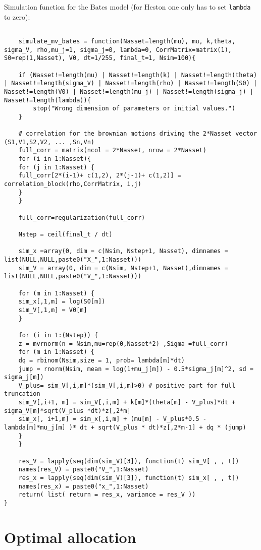 \bigskip
\noindent
Simulation function for the Bates model (for Heston one only has to set \texttt{lambda} to zero):
\begin{lstlisting}

	simulate_mv_bates = function(Nasset=length(mu), mu, k,theta, sigma_V, rho,mu_j=1, sigma_j=0, lambda=0, CorrMatrix=matrix(1), S0=rep(1,Nasset), V0, dt=1/255, final_t=1, Nsim=100){
	
	if (Nasset!=length(mu) | Nasset!=length(k) | Nasset!=length(theta) | Nasset!=length(sigma_V) | Nasset!=length(rho) | Nasset!=length(S0) | Nasset!=length(V0) | Nasset!=length(mu_j) | Nasset!=length(sigma_j) | Nasset!=length(lambda)){
		stop("Wrong dimension of parameters or initial values.")
	}
	
	# correlation for the brownian motions driving the 2*Nasset vector (S1,V1,S2,V2, ... ,Sn,Vn)
	full_corr = matrix(ncol = 2*Nasset, nrow = 2*Nasset) 
	for (i in 1:Nasset){
	for (j in 1:Nasset) {
	full_corr[2*(i-1)+ c(1,2), 2*(j-1)+ c(1,2)] = correlation_block(rho,CorrMatrix, i,j)
	}
	}
	
	full_corr=regularization(full_corr)
	
	Nstep = ceil(final_t / dt)
	
	sim_x =array(0, dim = c(Nsim, Nstep+1, Nasset), dimnames = list(NULL,NULL,paste0("X_",1:Nasset)))
	sim_V = array(0, dim = c(Nsim, Nstep+1, Nasset),dimnames = list(NULL,NULL,paste0("V_",1:Nasset)))
	
	for (m in 1:Nasset) {
	sim_x[,1,m] = log(S0[m])
	sim_V[,1,m] = V0[m]
	}
	
	for (i in 1:(Nstep)) {
	z = mvrnorm(n = Nsim,mu=rep(0,Nasset*2) ,Sigma =full_corr)
	for (m in 1:Nasset) {
	dq = rbinom(Nsim,size = 1, prob= lambda[m]*dt)
	jump = rnorm(Nsim, mean = log(1+mu_j[m]) - 0.5*sigma_j[m]^2, sd = sigma_j[m])
	V_plus= sim_V[,i,m]*(sim_V[,i,m]>0) # positive part for full truncation
	sim_V[,i+1, m] = sim_V[,i,m] + k[m]*(theta[m] - V_plus)*dt + sigma_V[m]*sqrt(V_plus *dt)*z[,2*m]
	sim_x[, i+1,m] = sim_x[,i,m] + (mu[m] - V_plus*0.5 -lambda[m]*mu_j[m] )* dt + sqrt(V_plus * dt)*z[,2*m-1] + dq * (jump)
	}
	}
	
	res_V = lapply(seq(dim(sim_V)[3]), function(t) sim_V[ , , t])
	names(res_V) = paste0("V_",1:Nasset)
	res_x = lapply(seq(dim(sim_V)[3]), function(t) sim_x[ , , t])
	names(res_x) = paste0("x_",1:Nasset)
	return( list( return = res_x, variance = res_V ))
}
\end{lstlisting}


\section{Optimal allocation}

